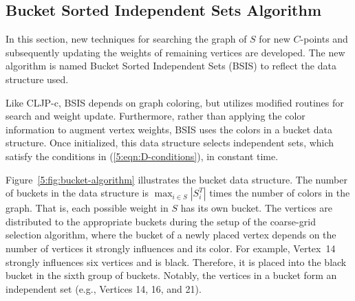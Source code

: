 \documentclass{elsart}
\begin{document}
\subsection{Bucket Sorted Independent Sets Algorithm}
\label{sec:bsis-alg}
In this section, new techniques for searching the graph of $S$ for new
$C$-points and subsequently updating the weights of remaining vertices
are developed. The new algorithm is named Bucket Sorted Independent
Sets (BSIS) to reflect the data structure used.

Like CLJP-c, BSIS depends on graph coloring, but utilizes modified
routines for search and weight update. Furthermore, rather than
applying the color information to augment vertex weights, BSIS uses
the colors in a bucket data structure. Once initialized, this data
structure selects independent sets, which satisfy the conditions in
(\ref{5:eqn:D-conditions}), in constant time.

Figure~\ref{5:fig:bucket-algorithm} illustrates the bucket data
structure. The number of buckets in the data structure is $\max_{i \in
S}|S_i^T|$ times the number of colors in the graph. That is, each
possible weight in $S$ has its own bucket. The vertices are
distributed to the appropriate buckets during the setup of the
coarse-grid selection algorithm, where the bucket of a newly placed
vertex depends on the number of vertices it strongly influences and
its color. For example, Vertex~14 strongly influences six vertices and
is black. Therefore, it is placed into the black bucket in the sixth
group of buckets. Notably, the vertices in a bucket form an
independent set (e.g., Vertices 14, 16, and 21).
\end{document}
